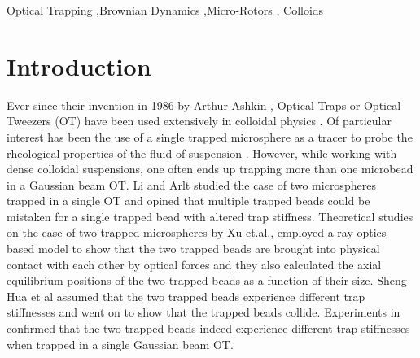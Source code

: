 \documentclass[preprint,  3p]{elsarticle}
\begin{document}
\begin{frontmatter}
		
\begin{keyword}
  Optical Trapping \sep Brownian Dynamics \sep Micro-Rotors \sep
  Colloids
\end{keyword}
		
\end{frontmatter}


\section{Introduction}

Ever since their invention in 1986 by Arthur Ashkin \cite{Ashkin_1986}, Optical Traps or Optical Tweezers (OT) have been used extensively in colloidal physics \cite{Leonardo_2008, Koehler_2011, Curran_1999}. Of particular interest has been the use of a single trapped microsphere as a tracer to probe the rheological properties of the fluid of suspension \cite{Atakhorrami_2006}. However, while working with dense colloidal suspensions, one often ends up trapping more than one microbead in a Gaussian beam OT. Li and Arlt \cite{Li_2008} studied the case of two microspheres trapped in a single OT and opined that multiple trapped beads could be mistaken for a single trapped bead with altered trap stiffness. Theoretical studies on the case of two trapped microspheres by Xu et.al., \cite{Xu_2005} employed a ray-optics based model to show that the two trapped beads are brought into physical contact with each other by optical forces and they also calculated the axial equilibrium positions of the two trapped beads as a function of their size. Sheng-Hua et al \cite{ShengHua_2005} assumed that the two trapped beads experience different trap stiffnesses and went on to show that the trapped beads collide. Experiments in \cite{Praveen_2016} confirmed that the two trapped beads indeed experience different trap stiffnesses when trapped in a single Gaussian beam OT.
\end{document}
